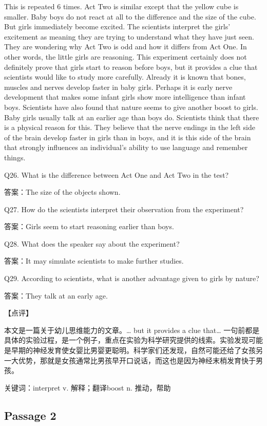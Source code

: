 \documentclass[UTF8,11pt]{ctexart}
\begin{document}
This is repeated 6 times. Act Two is similar except that the yellow cube is smaller. Baby boys do not react at all to the difference and the size of the cube. But girls immediately become excited. The scientists interpret the girls’ excitement as meaning they are trying to understand what they have just seen. They are wondering why Act Two is odd and how it differs from Act One. In other words, the little girls are reasoning. This experiment certainly does not definitely prove that girls start to reason before boys, but it provides a clue that scientists would like to study more carefully. Already it is known that bones, muscles and nerves develop faster in baby girls. Perhaps it is early nerve development that makes some infant girls show more intelligence than infant boys. Scientists have also found that nature seems to give another boost to girls. Baby girls usually talk at an earlier age than boys do. Scientists think that there is a physical reason for this. They believe that the nerve endings in the left side of the brain develop faster in girls than in boys, and it is this side of the brain that strongly influences an individual’s ability to use language and remember things.


Q26. What is the difference between Act One and Act Two in the test?


答案：The size of the objects shown.


Q27. How do the scientists interpret their observation from the experiment?


答案：Girls seem to start reasoning earlier than boys.


Q28. What does the speaker say about the experiment?


答案：It may simulate scientists to make further studies.


Q29. According to scientists, what is another advantage given to girls by nature?


答案：They talk at an early age.


【点评】


本文是一篇关于幼儿思维能力的文章。… but it provides a clue that… 一句前都是具体的实验过程，是一个例子，重点在实验为科学研究提供的线索。实验发现可能是早期的神经发育使女婴比男婴更聪明。科学家们还发现，自然可能还给了女孩另一大优势，那就是女孩通常比男孩早开口说话，而这也是因为神经末梢发育快于男孩。


关键词：interpret v. 解释；翻译boost n. 推动，帮助


\subsection*{Passage 2}
\end{document}
